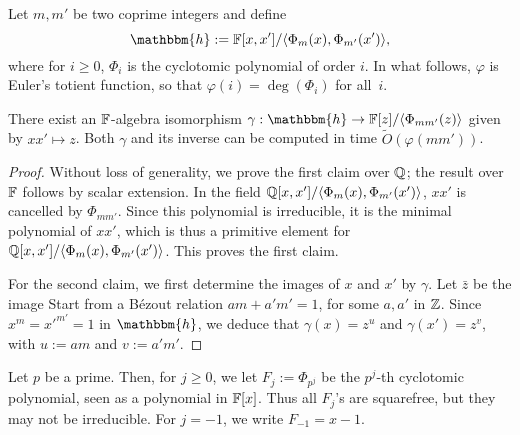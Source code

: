 Let $m,m'$ be two coprime integers and define
$$\mathbbm{h}:=\F[x,x']/\langle \Phi_{m}(x), \Phi_{m'}(x')\rangle,$$
where for $i \ge 0$, $\Phi_i$ is the cyclotomic polynomial of order
$i$. In what follows, $\varphi$ is Euler's totient function, so that
$\varphi(i) = \deg(\Phi_i)$ for all~$i$.
\begin{lemma}
  There exist an $\mathbb{F}$-algebra isomorphism $\gamma: \mathbbm{h} \to
  \F[z]/\langle\Phi_{mm'}(z)\rangle$ given by $xx' \mapsto z$. Both
  $\gamma$ and its inverse can be computed in time
  $\tilde{O}(\varphi(mm'))$.
\end{lemma}
\begin{proof}
  Without loss of generality, we prove the first claim over $\mathbb{Q}$; the
  result over $\mathbb{F}$ follows by scalar extension. In the field \sloppy
  $\mathbb{Q}[x,x']/\langle \Phi_{m}(x), \Phi_{m'}(x')\rangle$, $xx'$ is
  cancelled by $\Phi_{mm'}$. Since this polynomial is irreducible, it
  is the minimal polynomial of $xx'$, which is thus a primitive
  element for $\mathbb{Q}[x,x']/\langle \Phi_{m}(x),
  \Phi_{m'}(x')\rangle$. This proves the first claim.

  For the second claim, we first determine the images of $x$ and $x'$
  by $\gamma$. Let $\bar z$ be the image Start from a B\'ezout
  relation $am+ a'm'=1$, for some $a,a'$ in $\mathbb{Z}$.  Since $x^m =
  {x'}^{m'}=1$ in $\mathbbm{h}$, we deduce that $\gamma(x)=z^{u}$
  and $\gamma(x') = z^{v}$, with $u:=am$ and $v:=a'm'$.  

  
\end{proof}



  Let $p$ be a prime. Then, for $j \ge 0$, we let
$F_j:=\Phi_{p^j}$ be the $p^j$-th cyclotomic polynomial, seen as a
polynomial in $\mathbb{F}[x]$. Thus all $F_j$'s are squarefree, but they may
not be irreducible. For $j=-1$, we write $F_{-1} = x-1$.

